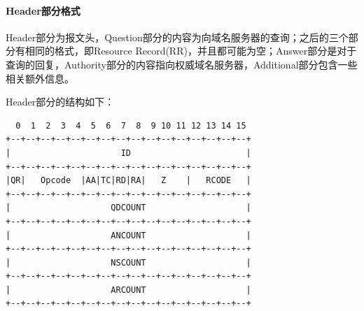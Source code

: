 \documentclass[lang=cn,11pt,a4paper,cite=authornum]{paper}
\begin{document}
\paragraph{Header部分格式}

Header部分为报文头，Question部分的内容为向域名服务器的查询；之后的三个部分有相同的格式，即Resource Record(RR)，并且都可能为空；Answer部分是对于查询的回复，Authority部分的内容指向权威域名服务器，Additional部分包含一些相关额外信息。

Header部分的结构如下：

\begin{code}
\begin{verbatim}
  0  1  2  3  4  5  6  7  8  9 10 11 12 13 14 15
+--+--+--+--+--+--+--+--+--+--+--+--+--+--+--+--+
|                      ID                       |
+--+--+--+--+--+--+--+--+--+--+--+--+--+--+--+--+
|QR|   Opcode  |AA|TC|RD|RA|   Z    |   RCODE   |
+--+--+--+--+--+--+--+--+--+--+--+--+--+--+--+--+
|                    QDCOUNT                    |
+--+--+--+--+--+--+--+--+--+--+--+--+--+--+--+--+
|                    ANCOUNT                    |
+--+--+--+--+--+--+--+--+--+--+--+--+--+--+--+--+
|                    NSCOUNT                    |
+--+--+--+--+--+--+--+--+--+--+--+--+--+--+--+--+
|                    ARCOUNT                    |
+--+--+--+--+--+--+--+--+--+--+--+--+--+--+--+--+
\end{verbatim}
\end{code}
\end{document}
